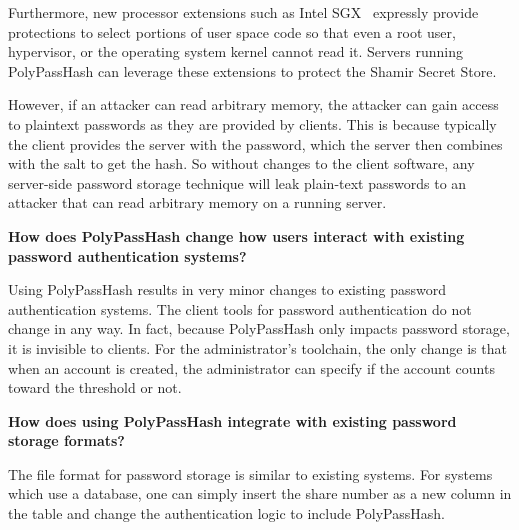 Furthermore, new processor extensions such as Intel 
SGX~\cite{mckeen2013innovative} expressly provide protections to select 
portions of user space code so that even a root user, hypervisor, or the 
operating system kernel cannot read it.   Servers running PolyPassHash can 
leverage these extensions to protect the Shamir Secret Store.

However, if an attacker can read
arbitrary memory, the attacker can gain access to plaintext passwords
as they are provided by clients.    This is because typically the client
provides the server with the password, which the
server then combines with the salt to get the hash.  
So without changes to the client software, any server-side
password storage technique will leak plain-text passwords to an attacker
that can read arbitrary memory on a running server.



{\bf How does PolyPassHash change how users interact with existing password authentication systems?}

Using PolyPassHash results in very minor changes to existing password
authentication systems.   
%
The client tools for password authentication do not change in any way.   In 
fact, because PolyPassHash only impacts password storage, it is invisible to 
clients.   %
For the administrator's toolchain, the only change is that 
when an account is created, the administrator can specify if the account counts
toward the threshold or not.

{\bf How does using PolyPassHash integrate with existing password storage 
formats?}

The file format for password storage is similar to existing systems.
For systems which use a database, one can simply insert the share number
as a new column in the table and change the authentication logic to include
PolyPassHash.   

